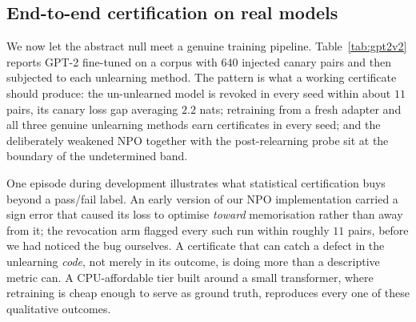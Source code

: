 \begin{table}[t]
\centering\small
\caption{The negative half of Theorem~\ref{thm:streaming}(a), measured: histories of
$K{=}10$ waves ($512$ pairs each, $500$ histories) containing one genuinely bad wave
($\Delta = 0.25 > \eps = 0.2$), restricted to the histories whose bad wave's
\emph{realised} cohort advantage does violate the tolerance. Multiplying certificate
e-values---the instinctive move---falsely certifies the whole history every time.}
\label{tab:certprod}

\end{table}

\begin{table}[t]
\centering\small
\caption{Streaming composition over $K{=}10$ waves ($512$ pairs each, $500$ histories).
The dagger excludes the genuinely bad wave. Bold marks the two payoffs: no false
history-wide certificate, and distributed weak leakage caught only by the product
alarm.}
\label{tab:streaming}

\end{table}

\subsection{End-to-end certification on real models}\label{sec:exp-e2e}

We now let the abstract null meet a genuine training pipeline. Table~\ref{tab:gpt2v2}
reports GPT-2 fine-tuned on a corpus with $640$ injected canary pairs and then
subjected to each unlearning method. The pattern is what a working certificate should
produce: the un-unlearned model is revoked in every seed within about $11$ pairs, its
canary loss gap averaging $2.2$ nats; retraining from a fresh adapter and all three
genuine unlearning methods earn certificates in every seed; and the deliberately
weakened NPO together with the post-relearning probe sit at the boundary of the
undetermined band.

One episode during development illustrates what statistical certification buys beyond a
pass/fail label. An early version of our NPO implementation carried a sign error that
caused its loss to optimise \emph{toward} memorisation rather than away from it; the
revocation arm flagged every such run within roughly $11$ pairs, before we had noticed
the bug ourselves. A certificate that can catch a defect in the unlearning \emph{code},
not merely in its outcome, is doing more than a descriptive metric can. A
CPU-affordable tier built around a small transformer, where retraining is cheap enough
to serve as ground truth, reproduces every one of these qualitative outcomes.

